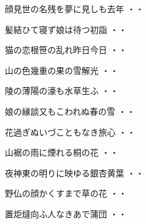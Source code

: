 \vspace{0.6cm}
\begin{shiika}顔見世の名残を夢に見しも去年
\hfill{・・}\end{shiika}
\vspace{0.6cm}
\begin{shiika}髪結ひて寝ず娘は待つ初詣
\hfill{・・}\end{shiika}
\vspace{0.6cm}
\begin{shiika}猫の恋根笹の乱れ昨日今日
\hfill{・・}\end{shiika}
\vspace{0.6cm}
\begin{shiika}山の色幾重の果の雪解光
\hfill{・・}\end{shiika}
\vspace{0.6cm}
\begin{shiika}陵の薄陽の濠も水草生ふ
\hfill{・・}\end{shiika}
\vspace{0.6cm}
\begin{shiika}娘の縁談又もこわれぬ春の雪
\hfill{・・}\end{shiika}
\vspace{0.6cm}
\begin{shiika}花過ぎぬいづこともなき旅心
\hfill{・・}\end{shiika}
\vspace{0.6cm}
\begin{shiika}山裾の雨に煙れる桐の花
\hfill{・・}\end{shiika}
\vspace{0.6cm}
\begin{shiika}夜神東の明りに映ゆる銀杏黄葉
\hfill{・・}\end{shiika}
\vspace{0.6cm}
\begin{shiika}野仏の顔かくすまで草の花
\hfill{・・}\end{shiika}
\vspace{0.6cm}
\begin{shiika}置炬燵向ふ人なきあで蒲団
\hfill{・・}\end{shiika}
